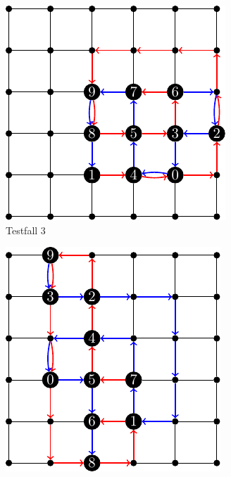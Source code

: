 \documentclass[bachelor, german]{algothesis}
\begin{document}
\begin{figure}[H]
    \centering
    \begin{subfigure}[b]{0.4\textwidth}
        \centering
        \includegraphics[width=\textwidth]{figures/Testfall3.pdf}
        \caption{Testfall 3}
        \label{fig:teilbild_a}
    \end{subfigure}
    \hfill
    \begin{subfigure}[b]{0.4\textwidth}
        \centering
        \includegraphics[width=\textwidth]{figures/Testfall4.pdf}

\end{subfigure}
\end{figure}
\end{document}
